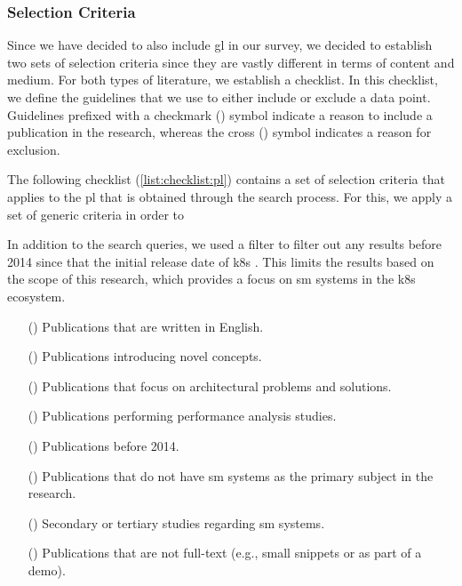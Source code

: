 



\subsubsection{Selection Criteria}
\label{sec:survey:methodology:review-protocol:selection-criteria}
Since we have decided to also include \gls{gl} in our survey, we decided to establish two sets of selection criteria since they are vastly different in terms of content and medium. For both types of literature, we establish a checklist. In this checklist, we define the guidelines that we use to either include or exclude a data point. Guidelines prefixed with a checkmark (\cmark) symbol indicate a reason to include a publication in the research, whereas the cross (\xmark) symbol indicates a reason for exclusion. 

The following checklist (\cref{list:checklist:pl}) contains a set of selection criteria that applies to the \gls{pl} that is obtained through the search process. For this, we apply a set of generic criteria in order to 

In addition to the search queries, we used a filter to filter out any results before 2014 since that the initial release date of \gls{k8s} \cite{kubernetes-launch}. This limits the results based on the scope of this research, which provides a focus on \gls{sm} systems in the \gls{k8s} ecosystem.

\begin{itemize}
    \item[(\cmark)] Publications that are written in English.
    \item[(\cmark)] Publications introducing novel concepts.
    \item[(\cmark)] Publications that focus on architectural problems and solutions.
    \item[(\cmark)] Publications performing performance analysis studies.
    
    \item[(\xmark)] Publications before 2014. 
    \item[(\xmark)] Publications that do not have \gls{sm} systems as the primary subject in the research. 
    \item[(\xmark)] Secondary or tertiary studies regarding \gls{sm} systems.
    \item[(\xmark)] Publications that are not full-text (e.g., small snippets or as part of a demo).
    
    \label{list:checklist:pl}
\end{itemize}


